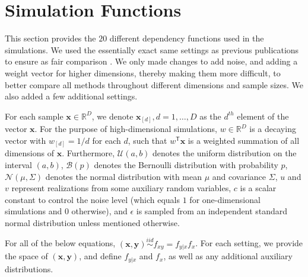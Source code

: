 \documentclass[11pt]{article}
\providecommand{\mb}[1]{\boldsymbol{#1}}
\providecommand{\mc}[1]{\mathcal{#1}}
\newcommand{\Real}{\mathbb{R}}
\newcommand{\T}{^{\ensuremath{\mathsf{T}}}}           %
\newcommand{\mbx}{\ensuremath{\mb{x}}}
\begin{document}
\clearpage
\appendix
\setcounter{figure}{0}
\renewcommand\thefigure{A\arabic{figure}}

\section{Simulation Functions}
\label{appen:function}

This section provides the $20$ different dependency functions used in the simulations.  We used the essentially exact same settings as previous publications to ensure as fair comparison \cite{SzekelyRizzoBakirov2007, SimonTibshirani2012, SimonTibshirani2012, GorfineHellerHeller2012}.  We only made changes to add noise, and adding a weight vector for higher dimensions, thereby making them more difficult, to better compare all methods throughout different dimensions and sample sizes. We also added a few additional settings.

For each sample $\mb{x} \in \Real^{D}$, we denote $\mb{x}_{[d]}, d=1,\ldots,D$ as the $d^{th}$ element of the vector  \mbx. For the purpose of high-dimensional simulations, $w \in \Real^{D}$ is a decaying vector with $w_{[d]}=1/d$ for each $d$, such that $w\T \mb{x}$ is a 
weighted summation of all dimensions of \mbx. %
Furthermore, $\mc{U}(a,b)$ denotes the uniform distribution on the interval $(a,b)$, $\mc{B}(p)$ denotes the Bernoulli distribution with probability $p$, $\mc{N}(\mu,{\Sigma})$ denotes the normal distribution with mean ${\mu}$ and covariance ${\Sigma}$, 
$u$ and $v$ represent realizations from some auxiliary random variables, $c$ is a scalar constant to control the noise level (which equals $1$ for one-dimensional simulations and $0$ otherwise), and $\epsilon$ is sampled from an independent standard normal distribution unless mentioned otherwise.

For all of the below equations, $(\mb{x},\mb{y}) \overset{iid}{\sim} f_{xy} = f_{y|x} f_x$. For each setting, we provide the space of $(\mb{x},\mb{y})$, and define $f_{y|x}$ and $f_x$, as well as any additional auxiliary distributions.
\end{document}
